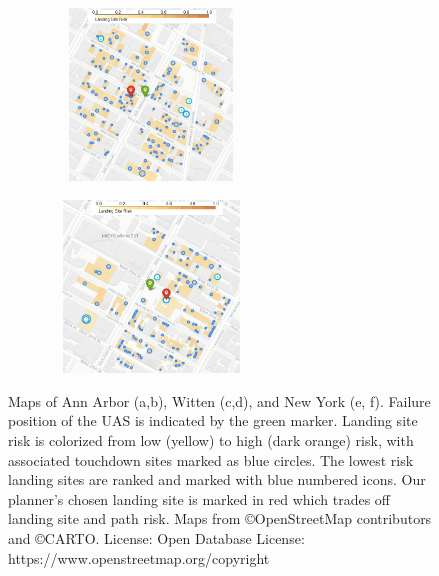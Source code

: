\begin{figure}[!ht]
\begin{subfigure}[b]{0.47\linewidth}
        \caption{\label{fig:ch5_wt_map2}}
      \end{subfigure}
      \begin{subfigure}[b]{0.47\linewidth}
        \centering\includegraphics[clip, width=155pt, height=130pt]{chapter_5_mapping/imgs/newyork_scenario_1.png}
        \caption{\label{fig:ch5_ny_map1}}
      \end{subfigure}
      \begin{subfigure}[b]{0.47\linewidth}
        \centering\includegraphics[width=155pt, height=130pt]{chapter_5_mapping/imgs/newyork_scenario_4.png}
        \caption{\label{fig:ch5_ny_map2}}
      \end{subfigure}
         \caption[Maps of case studies for emergency landing]{Maps of Ann Arbor (a,b), Witten (c,d), and New York (e, f).  Failure position of the \ac{UAS} is indicated by the green marker. Landing site risk is colorized from low (yellow) to high (dark orange) risk, with associated touchdown sites marked as blue circles. The lowest risk landing sites are ranked and marked with blue numbered icons. Our planner's chosen landing site is marked in red which trades off landing site and path risk. Maps from \copyright OpenStreetMap contributors and \copyright CARTO. License: Open Database License: https://www.openstreetmap.org/copyright}
     \label{fig:ch5_all_scenarios_map}
\end{figure}

